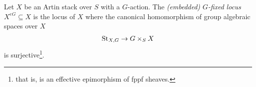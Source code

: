 \begin{definition}\label{rl-001C}
\cite{aranha-khan-latyntsev-etal_VirtualLocalizationRevisited2025}
  Let \(X\) be an Artin stack over \(S\) with a \(G\)-action. The \emph{(embedded) \(G\)-fixed locus} \(X^{eG}\subseteq X\) is the locus of \(X\) where the canonical homomorphism of group algebraic spaces over \(X\)
  \begin{align*}
    \operatorname{St}_{X,G}\to G \times_S X
  \end{align*}
  is surjective\footnote{that is, is an effective epimorphism of fppf sheaves.}.
\end{definition}
